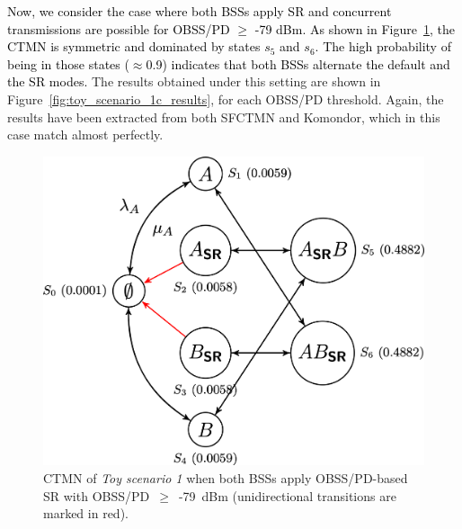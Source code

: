 \documentclass[preprint,12pt]{elsarticle}
\theoremstyle{plain}
\begin{document}
\textcolor{black}{Now, we consider the case where both BSSs apply SR and concurrent transmissions are possible for OBSS/PD $\geq$ -79 dBm. As shown in Figure~\ref{fig:ctmn_toy_scenario_1c}, the CTMN is symmetric and dominated by states $s_5$  and $s_6$. The high probability of being in those states ($\approx$0.9) indicates that both BSSs alternate the default and the SR modes.} The results obtained under this setting are shown in Figure~\ref{fig:toy_scenario_1c_results}, for each OBSS/PD threshold. Again, the results have been extracted from both SFCTMN and Komondor, which in this case  match almost perfectly.

\begin{figure}[ht!]
	\centering    
	\includegraphics[width=.45\columnwidth]{ctmn_toy_scenario_1c}
	\caption{CTMN of \emph{Toy scenario 1} when both BSSs apply OBSS/PD-based SR with OBSS/PD~$\geq$~-79~dBm (unidirectional transitions are marked in red).}
	\label{fig:ctmn_toy_scenario_1c}
\end{figure}

%
\end{document}

